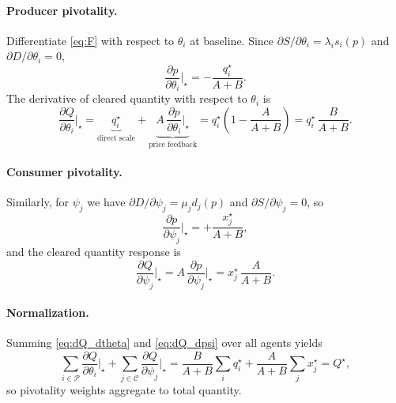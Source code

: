 \documentclass[journal, a4paper]{IEEEtran}
\begin{document}
\paragraph{Producer pivotality.}
Differentiate \eqref{eq:F} with respect to $\theta_i$ at baseline. Since $\partial S/\partial \theta_i=\lambda_i s_i(p)$ and $\partial D/\partial \theta_i=0$,
\begin{equation}
\frac{\partial p}{\partial \theta_i}\Big|_\star = -\frac{q_i^\star}{A+B}.
\label{eq:dp_dtheta}
\end{equation}
The derivative of cleared quantity with respect to $\theta_i$ is
\begin{equation}
\frac{\partial Q}{\partial \theta_i}\Big|_\star
=
\underbrace{q_i^\star}_{\text{direct scale}}
+
\underbrace{A\,\frac{\partial p}{\partial \theta_i}\Big|_\star}_{\text{price feedback}}
=
q_i^\star\left(1-\frac{A}{A+B}\right)
=
q_i^\star\,\frac{B}{A+B}.
\label{eq:dQ_dtheta}
\end{equation}

\paragraph{Consumer pivotality.}
Similarly, for $\psi_j$ we have $\partial D/\partial \psi_j=\mu_j d_j(p)$ and $\partial S/\partial \psi_j=0$, so
\begin{equation}
\frac{\partial p}{\partial \psi_j}\Big|_\star = +\frac{x_j^\star}{A+B},
\end{equation}
and the cleared quantity response is
\begin{equation}
\frac{\partial Q}{\partial \psi_j}\Big|_\star
=
A\,\frac{\partial p}{\partial \psi_j}\Big|_\star
=
x_j^\star\,\frac{A}{A+B}.
\label{eq:dQ_dpsi}
\end{equation}

\paragraph{Normalization.}
Summing \eqref{eq:dQ_dtheta} and \eqref{eq:dQ_dpsi} over all agents yields
\begin{equation}
\sum_{i\in\mathcal{P}}\frac{\partial Q}{\partial \theta_i}\Big|_\star
+
\sum_{j\in\mathcal{C}}\frac{\partial Q}{\partial \psi_j}\Big|_\star
=
\frac{B}{A+B}\sum_i q_i^\star+\frac{A}{A+B}\sum_j x_j^\star
=
Q^\star,
\label{eq:pivotal_sum}
\end{equation}
so pivotality weights aggregate to total quantity.
\end{document}
